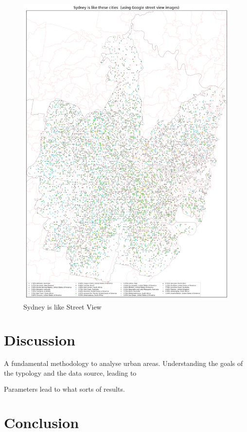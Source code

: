 \documentclass[sageh,times]{sagej}
\begin{document}
\begin{figure}[!htbp]
\includegraphics[scale=0.20]{Images/SydneyOverallAbrev_street.png}  
\caption{Sydney is like Street View}    
 \label{fig:sydstreet}  
\end{figure} 





\section{Discussion}\label{sec:discussion}

A fundamental methodology to analyse urban areas. Understanding the goals of the typology and the data source, leading to 

Parameters lead to what sorts of results.

\section{Conclusion}\label{sec:conclusion}


  
  
\end{document}
